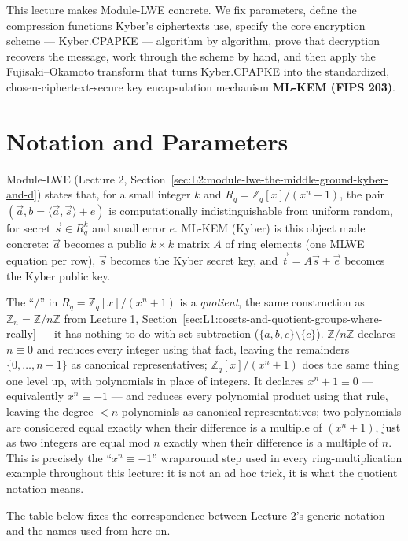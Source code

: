 This lecture makes Module-LWE concrete. We fix parameters, define the compression functions Kyber's ciphertexts use, specify the core encryption scheme --- Kyber.CPAPKE --- algorithm by algorithm, prove that decryption recovers the message, work through the scheme by hand, and then apply the Fujisaki--Okamoto transform that turns Kyber.CPAPKE into the standardized, chosen-ciphertext-secure key encapsulation mechanism \textbf{ML-KEM (FIPS 203)}.

\section{Notation and Parameters}
\label{sec:L3:recap-what-you-already-have}

Module-LWE (Lecture 2, Section~\ref{sec:L2:module-lwe-the-middle-ground-kyber-and-d}) states that, for a small integer $k$ and $R_q = \mathbb{Z}_q[x]/(x^n+1)$, the pair $(\vec a, b = \langle \vec a,\vec s\rangle + e)$ is computationally indistinguishable from uniform random, for secret $\vec s \in R_q^k$ and small error $e$. ML-KEM (Kyber) is this object made concrete: $\vec a$ becomes a public $k\times k$ matrix $A$ of ring elements (one MLWE equation per row), $\vec s$ becomes the Kyber secret key, and $\vec t = A\vec s + \vec e$ becomes the Kyber public key.

The ``$/$'' in $R_q=\mathbb{Z}_q[x]/(x^n+1)$ is a \emph{quotient}, the same construction as $\mathbb{Z}_n=\mathbb{Z}/n\mathbb{Z}$ from Lecture 1, Section~\ref{sec:L1:cosets-and-quotient-groups-where-really} --- it has nothing to do with set subtraction ($\{a,b,c\}\setminus\{c\}$). $\mathbb{Z}/n\mathbb{Z}$ declares $n\equiv0$ and reduces every integer using that fact, leaving the remainders $\{0,\ldots,n-1\}$ as canonical representatives; $\mathbb{Z}_q[x]/(x^n+1)$ does the same thing one level up, with polynomials in place of integers. It declares $x^n+1\equiv0$ --- equivalently $x^n\equiv-1$ --- and reduces every polynomial product using that rule, leaving the degree-${<}n$ polynomials as canonical representatives; two polynomials are considered equal exactly when their difference is a multiple of $(x^n+1)$, just as two integers are equal mod $n$ exactly when their difference is a multiple of $n$. This is precisely the ``$x^n\equiv-1$'' wraparound step used in every ring-multiplication example throughout this lecture: it is not an ad hoc trick, it is what the quotient notation means.

The table below fixes the correspondence between Lecture 2's generic notation and the names used from here on.

